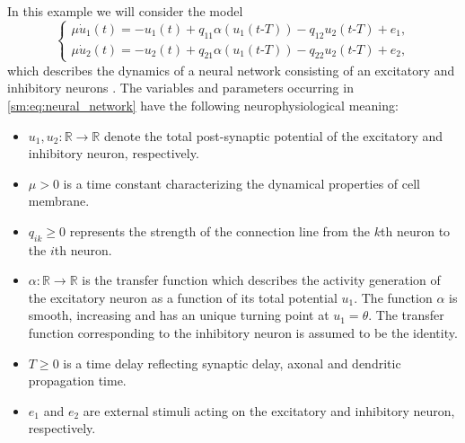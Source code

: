 In this example we will consider the model 
\begin{equation}
\label{sm:eq:neural_network}
\begin{cases}
\mu\dot{u}_1(t) = -u_1(t) + q_{11}\alpha(u_1(t\text{-}T))-q_{12}u_2(t\text{-}T) + e_1,\\
\mu\dot{u}_2(t) = -u_2(t) + q_{21}\alpha(u_1(t\text{-}T))-q_{22}u_2(t\text{-}T) + e_2,
\end{cases}
\end{equation}
which describes the dynamics of a neural network consisting of an
excitatory and inhibitory neurons \cite{giannakopoulos2001bifurcations}.
The variables and parameters occurring in \cref{sm:eq:neural_network}
have the following neurophysiological meaning:
\begin{itemize}
\item $u_1,u_2:\mathbb{R}\rightarrow\mathbb{R}$ denote the total post-synaptic
potential of the excitatory and inhibitory neuron, respectively.
\item $\mu>0$ is a time constant characterizing the dynamical properties
of cell membrane.
\item $q_{ik}\geq0$ represents the strength of the connection line from
the $k$th neuron to the $i$th neuron.
\item $\alpha:\mathbb{R}\rightarrow\mathbb{R}$ is the transfer function
which describes the activity generation of the excitatory neuron as
a function of its total potential $u_1$. The function $\alpha$
is smooth, increasing and has an unique turning point at $u_1 = \theta$.
The transfer function corresponding to the inhibitory neuron is assumed
to be the identity.
\item $T\geq0$ is a time delay reflecting synaptic delay, axonal and dendritic
propagation time.
\item $e_1$ and $e_2$ are external stimuli acting on the excitatory
and inhibitory neuron, respectively.
\end{itemize}

